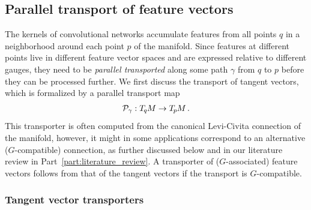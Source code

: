 

\subsection{Parallel transport of feature vectors}
\label{sec:transport_local}

The kernels of convolutional networks accumulate features from all points $q$ in a neighborhood around each point $p$ of the manifold.
Since features at different points live in different feature vector spaces and are expressed relative to different gauges, they need to be \emph{parallel transported} along some path $\gamma$ from $q$ to $p$ before they can be processed further.
We first discuss the transport of tangent vectors, which is formalized by a parallel transport map
\begin{align}
    \mathcal{P}_\gamma: T_{\mkern-1.5mu q}\mkern-.5muM \to T_{\mkern-1.5mu p}\mkern-.5muM \,.
\end{align}
This transporter is often computed from the canonical Levi-Civita connection of the manifold, however, it might in some applications correspond to an alternative ($G$-compatible) connection, as further discussed below and in our literature review in Part~\ref{part:literature_review}.
A transporter of ($G$-associated) feature vectors follows from that of the tangent vectors if the transport is $G$-compatible.




\subsubsection{Tangent vector transporters}


